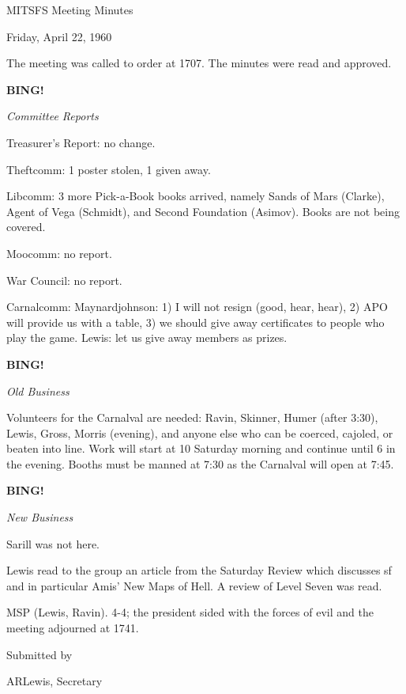 \documentclass[12pt]{article}
\newcommand{\bing}{{\bf BING!} }
\newcommand{\goto}[1]{\bing \vskip 12pt \centerline{{\em{#1}}}}
\begin{document}
\begin{center}

MITSFS Meeting Minutes

Friday, April 22, 1960

\end{center}
 
\vspace{12pt}

\setlength{\parskip}{6pt}

\noindent
The meeting was called to order at 1707. The minutes were read and approved.

\goto{Committee Reports}

Treasurer's Report: no change.

Theftcomm: 1 poster stolen, 1 given away.

Libcomm: 3 more Pick-a-Book books arrived, namely Sands of Mars (Clarke), Agent of Vega (Schmidt), and Second Foundation (Asimov). Books are not being covered.

Moocomm: no report.

War Council: no report.

Carnalcomm: Maynardjohnson: 1) I will not resign (good, hear, hear), 2) APO will provide us with a table, 3) we should give away certificates to people who play the game. Lewis: let us give away members as prizes.

\goto{Old Business}

Volunteers for the Carnalval are needed: Ravin, Skinner, Humer (after 3:30), Lewis, Gross, Morris (evening), and anyone else who can be coerced, cajoled, or beaten into line. Work will start at 10 Saturday morning and continue until 6 in the evening. Booths must be manned at 7:30 as the Carnalval will open at 7:45.

\goto{New Business}

Sarill was not here.

Lewis read to the group an article from the Saturday Review which discusses sf and in particular Amis' New Maps of Hell. A review of Level Seven was read.

MSP (Lewis, Ravin). 4-4; the president sided with the forces of evil and the meeting adjourned at 1741.

\vspace{12pt}

\centerline{Submitted by}
\centerline{ARLewis, Secretary}
\end{document}
